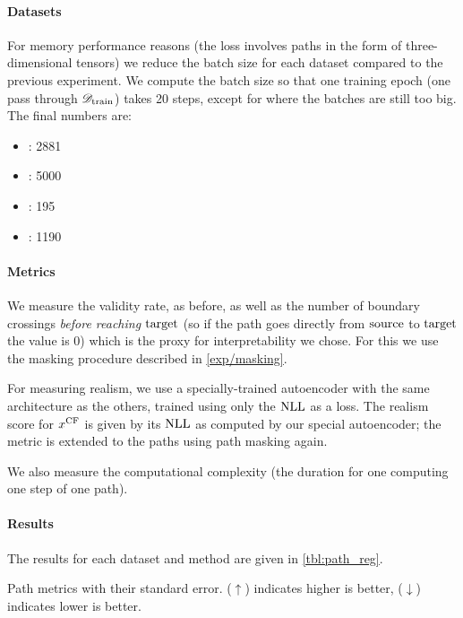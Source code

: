 \documentclass[../main.tex]{subfiles}
\begin{document}
\paragraph{Datasets}

For memory performance reasons (the loss involves paths in the form of three-dimensional tensors) we reduce the batch size for each dataset compared to the previous experiment.
We compute the batch size so that one training epoch (one pass through $\mathscr{D}_\text{train}$) takes 20 steps, except for \ForestCover{} where the batches are still too big.
The final numbers are:
\begin{itemize}
    \item \CakeOnSea: 2881
    \item \ForestCover: 5000
    \item \WineQuality: 195
    \item \OnlineNewsPopularity: 1190
\end{itemize}

\paragraph{Metrics}

We measure the validity rate, as before, as well as the number of boundary crossings \emph{before reaching $\mathrm{target}$} (so if the path goes directly from $\mathrm{source}$ to $\mathrm{target}$ the value is 0) which is the proxy for interpretability we chose.
For this we use the masking procedure described in \autoref{exp/masking}.

For measuring realism, we use a specially-trained autoencoder with the same architecture as the others, trained using only the $\text{NLL}$ as a loss.
The realism score for $x^\mathrm{CF}$ is given by its $\text{NLL}$ as computed by our special autoencoder;
the metric is extended to the paths using path masking again.

We also measure the computational complexity (the duration for one computing one step of one path).

\paragraph{Results}

The results for each dataset and method are given in \autoref{tbl:path_reg}.

\begin{table}[h!]
    \centering
    
    \caption{Path metrics with their standard error. ($\uparrow$) indicates higher is better, ($\downarrow$) indicates lower is better.}
    \label{tbl:path_reg}
\end{table}
\end{document}
